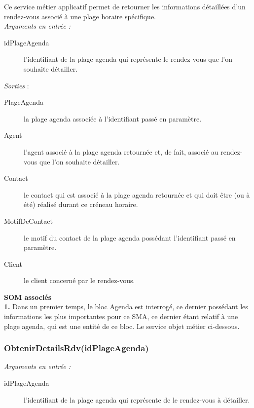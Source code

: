 Ce service métier applicatif permet de retourner les informations détaillées d'un rendez-vous associé à une plage horaire spécifique.\\

\noindent \textit{Arguments en entrée :}
\begin{description}
\item[idPlageAgenda] l'identifiant de la plage agenda qui représente le rendez-vous que l'on souhaite détailler. \\
\end{description}

\noindent \textit{Sorties} : 
\begin{description}
\item[PlageAgenda] la plage agenda associée à l'identifiant passé en paramètre. 
\item[Agent] l'agent associé à la plage agenda retournée et, de fait, associé au rendez-vous que l'on souhaite détailler. 
\item[Contact] le contact qui est associé à la plage agenda retournée et qui doit être (ou à été) réalisé durant ce créneau horaire.
\item[MotifDeContact] le motif du contact de la plage agenda possédant l'identifiant passé en paramètre. 
\item[Client] le client concerné par le rendez-vous. \\
\end{description}


\begin{shaded}
\textbf{SOM associés}\\
\textbf{1.} Dans un premier temps, le bloc Agenda est interrogé, ce dernier possédant les informations les plus importantes pour ce SMA, ce dernier étant relatif à une plage agenda, qui est une entité de ce bloc. Le service objet métier ci-dessous.
\end{shaded}


\subsubsection{ObtenirDetailsRdv(idPlageAgenda)}

\noindent \textit{Arguments en entrée :}
\begin{description}
\item[idPlageAgenda] l'identifiant de la plage agenda qui représente de le rendez-vous à détailler. \\
\end{description}

